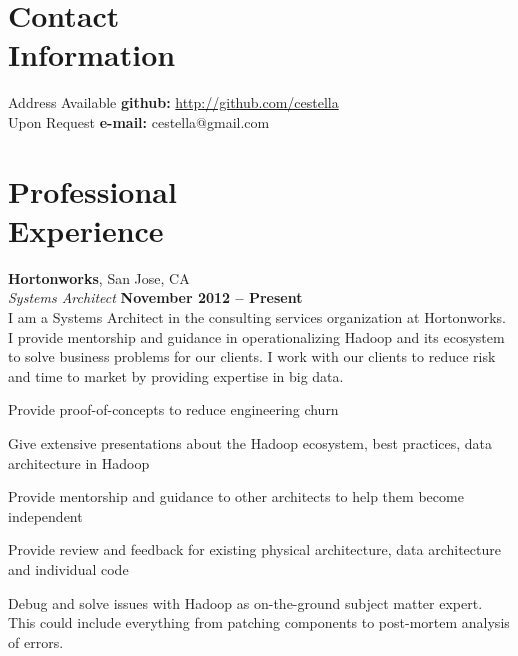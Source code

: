 \documentclass[margin,line,12pt]{resume}
\begin{document}
\begin{resume}
    \thispagestyle{empty}
    \section{\mysidestyle Contact\\Information}

    Address Available             \hfill {\bf github:} \url{http://github.com/cestella} \vspace{0mm}\\\vspace{0mm}%
    Upon Request                  \hfill {\bf e-mail:} cestella@gmail.com       \vspace{0mm}\\\vspace{-4.5mm}%

    \section{\mysidestyle Professional\\Experience}
    \textbf{Hortonworks}, San Jose, CA \vspace{2mm}\\\vspace{1mm}%
    \textsl{Systems Architect} \hfill \textbf{November 2012 -- Present}\\
    I am a Systems Architect in the consulting services organization at Hortonworks.  I provide
    mentorship and guidance in operationalizing Hadoop and its ecosystem to solve business problems
    for our clients.  I work with our clients to reduce risk and time to market by providing expertise 
    in big data.

    \begin{list2}
    \item  Provide proof-of-concepts to reduce engineering churn
    \item  Give extensive presentations about the Hadoop ecosystem, best practices, data architecture in Hadoop
    \item  Provide mentorship and guidance to other architects to help them become independent
    \item  Provide review and feedback for existing physical architecture, data architecture and individual code
    \item  Debug and solve issues with Hadoop as on-the-ground subject matter expert.  This could include everything from patching components to post-mortem analysis of errors.
    \end{list2}


\end{resume}
\end{document}
